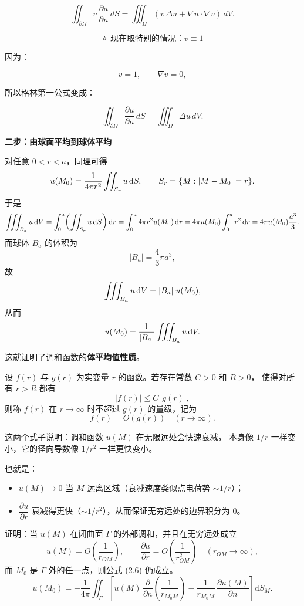\begin{solution}
\begin{dxtips}
\[
\iint_{\partial\Omega} v\,\frac{\partial u}{\partial n}\, dS
=
\iiint_{\Omega} (v\,\Delta u + \nabla u\cdot\nabla v)\, dV.
\]

\bigskip

\[
\textbf{⭐ 现在取特别的情况：} v \equiv 1
\]

因为：

\[
v = 1, \qquad \nabla v = 0,
\]

所以格林第一公式变成：

\[
\iint_{\partial\Omega} \frac{\partial u}{\partial n}\, dS
=
\iiint_{\Omega} \Delta u\, dV.
\]
\end{dxtips}
\medskip
\noindent\textbf{二步：由球面平均到球体平均}

对任意 $0<r<a$，同理可得
\[
u(M_0)=\frac{1}{4\pi r^2}\iint_{S_r}u\,{\rm d}S,
\qquad S_r=\{M:|M-M_0|=r\}.
\]
于是
\[
\iiint_{B_a}u\,{\rm d}V
=\int_0^a\!\left(\iint_{S_r}u\,{\rm d}S\right){\rm d}r
=\int_0^a 4\pi r^2 u(M_0)\,{\rm d}r
=4\pi u(M_0)\int_0^a r^2\,{\rm d}r
=4\pi u(M_0)\frac{a^3}{3}.
\]
而球体 $B_a$ 的体积为
\[
|B_a|=\frac{4}{3}\pi a^3,
\]
故
\[
\iiint_{B_a}u\,{\rm d}V
=|B_a|\;u(M_0),
\]
从而
\[
u(M_0)=\frac{1}{|B_a|}\iiint_{B_a}u\,{\rm d}V.
\]

这就证明了调和函数的\textbf{体平均值性质}。
\end{solution}
\begin{definition}[大 $O$ 记号]
设 $f(r)$ 与 $g(r)$ 为实变量 $r$ 的函数。若存在常数 $C>0$ 和 $R>0$，
使得对所有 $r>R$ 都有
\[
|f(r)| \le C\,|g(r)|,
\]
则称 $f(r)$ 在 $r\to\infty$ 时不超过 $g(r)$ 的量级，记为
\[
f(r)=O(g(r)) \quad (r\to\infty).
\]
\end{definition}
\begin{dxtips}
    这两个式子说明：调和函数 $u(M)$ 在无限远处会快速衰减，
本身像 $1/r$ 一样变小，它的径向导数像 $1/r^{2}$ 一样更快变小。

也就是：
\begin{itemize}
    \item $u(M)\to 0$ 当 $M$ 远离区域（衰减速度类似点电荷势 $\sim 1/r$）；
    \item $\dfrac{\partial u}{\partial r}$ 衰减得更快（$\sim 1/r^{2}$），从而保证无穷远处的边界积分为 $0$。
\end{itemize}
\end{dxtips}
\begin{homework}[4]
证明：当 $u(M)$ 在闭曲面 $\Gamma$ 的外部调和，并且在无穷远处成立
\[
u(M)=O\!\left(\frac{1}{r_{OM}}\right),\qquad
\frac{\partial u}{\partial r}=O\!\left(\frac{1}{r_{OM}^2}\right)
\quad (r_{OM}\to\infty),
\]
而 $M_0$ 是 $\Gamma$ 外的任一点，则公式 (2.6) 仍成立。
\begin{equation}\tag{2.6}\label{eq:2.6}
u(M_0)
= -\frac{1}{4\pi}
  \iint_{\Gamma}
  \left[
    u(M)\,\frac{\partial}{\partial n}
      \!\left(\frac{1}{r_{M_0M}}\right)
    - \frac{1}{r_{M_0M}}\,
      \frac{\partial u(M)}{\partial n}
  \right]\mathrm dS_M .
\end{equation}
\end{homework}
